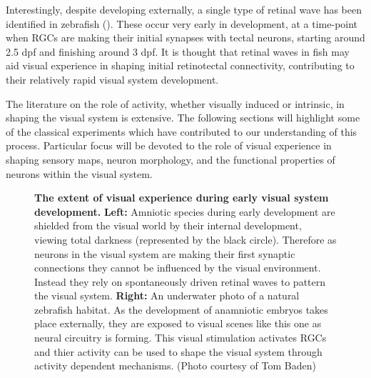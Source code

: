 Interestingly, despite developing externally, a single type of retinal wave has been identified in zebrafish (\cite{Zhang2016StereotypedAutoreceptors}). These occur very early in development, at a time-point when RGCs are making their initial synapses with tectal neurons, starting around 2.5 \gls{dpf} and finishing around 3 dpf. It is thought that retinal waves in fish may aid visual experience in shaping initial retinotectal connectivity, contributing to their relatively rapid visual system development. 

The literature on the role of activity, whether visually induced or intrinsic, in shaping the visual system is extensive. The following sections will highlight some of the classical experiments which have contributed to our understanding of this process. Particular focus will be devoted to the role of visual experience in shaping sensory maps, neuron morphology, and the functional properties of neurons within the visual system.




\begin{figure}[!ht]
            \caption[\textbf{\label{fig:I_visual_expeirence_fig}\textbf{The extent of visual experience during early visual system development.}}]{ \textbf{\label{fig:I_visual_expeirence_fig}  The extent of visual experience during early visual system development.} \textbf{Left:} Amniotic species during early development are shielded from the visual world by their internal development, viewing total darkness (represented by the black circle). Therefore as neurons in the visual system are making their first synaptic connections they cannot be influenced by the visual environment. Instead they rely on spontaneously driven retinal waves to pattern the visual system. \textbf{Right:} An underwater photo of a natural zebrafish habitat.  As the development of anamniotic embryos takes place externally, they are exposed to visual scenes like this one as neural circuitry is forming. This visual stimulation activates RGCs and thier activity can be used to shape the visual system through activity dependent mechanisms. (Photo courtesy of Tom Baden)}

      \end{figure}

